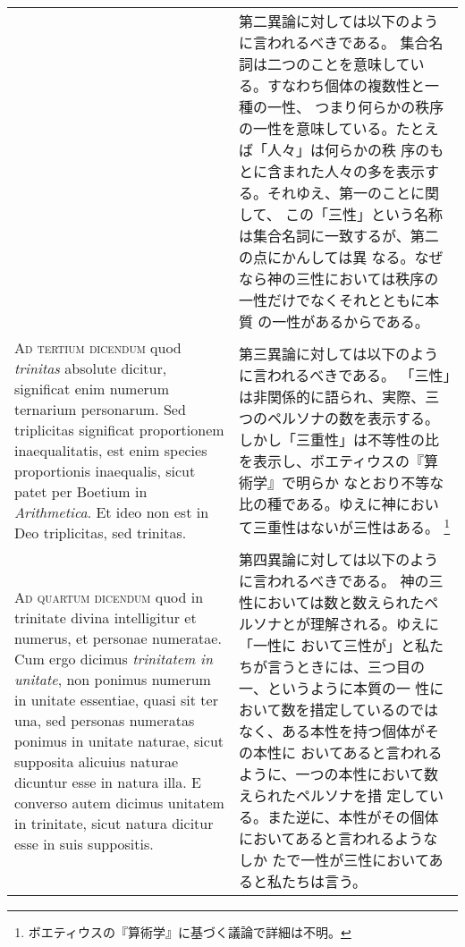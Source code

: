 \documentclass[10pt]{jsarticle} %
\begin{document}
\begin{longtable}{p{21em}p{21em}}
&


第二異論に対しては以下のように言われるべきである。
集合名詞は二つのことを意味している。すなわち個体の複数性と一種の一性、
 つまり何らかの秩序の一性を意味している。たとえば「人々」は何らかの秩
 序のもとに含まれた人々の多を表示する。それゆえ、第一のことに関して、
 この「三性」という名称は集合名詞に一致するが、第二の点にかんしては異
 なる。なぜなら神の三性においては秩序の一性だけでなくそれとともに本質
 の一性があるからである。


\\



{\scshape Ad tertium dicendum} quod {\itshape trinitas} absolute dicitur, significat enim
numerum ternarium personarum. Sed triplicitas significat proportionem
inaequalitatis, est enim species proportionis inaequalis, sicut patet
per Boetium in {\itshape Arithmetica}. Et ideo non est in Deo triplicitas, sed
trinitas.


&

第三異論に対しては以下のように言われるべきである。
「三性」は非関係的に語られ、実際、三つのペルソナの数を表示する。
しかし「三重性」は不等性の比を表示し、ボエティウスの『算術学』で明らか
 なとおり不等な比の種である。ゆえに神において三重性はないが三性はある。
 \footnote{ボエティウスの『算術学』に基づく議論で詳細は不明。}

\\



{\scshape Ad quartum dicendum} quod in trinitate divina intelligitur et numerus,
et personae numeratae. Cum ergo dicimus {\itshape trinitatem in unitate}, non
ponimus numerum in unitate essentiae, quasi sit ter una, sed personas
numeratas ponimus in unitate naturae, sicut supposita alicuius naturae
dicuntur esse in natura illa. E converso autem dicimus unitatem in
trinitate, sicut natura dicitur esse in suis suppositis.


&

第四異論に対しては以下のように言われるべきである。
神の三性においては数と数えられたペルソナとが理解される。ゆえに「一性に
 おいて三性が」と私たちが言うときには、三つ目の一、というように本質の一
 性において数を措定しているのではなく、ある本性を持つ個体がその本性に
 おいてあると言われるように、一つの本性において数えられたペルソナを措
 定している。また逆に、本性がその個体においてあると言われるようなしか
 たで一性が三性においてあると私たちは言う。


\\




\end{longtable}
\end{document}
